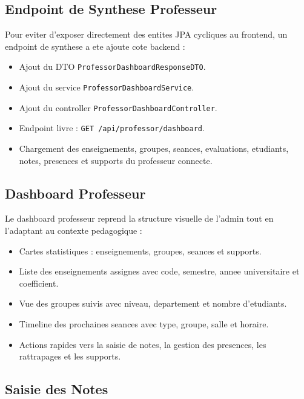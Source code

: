 \documentclass[12pt,a4paper]{report}
\begin{document}
\subsection{Endpoint de Synthese Professeur}

Pour eviter d'exposer directement des entites JPA cycliques au frontend, un endpoint de synthese a ete ajoute cote backend :

\begin{itemize}[itemsep=0.3em]
    \item Ajout du DTO \texttt{ProfessorDashboardResponseDTO}.
    \item Ajout du service \texttt{ProfessorDashboardService}.
    \item Ajout du controller \texttt{ProfessorDashboardController}.
    \item Endpoint livre : \texttt{GET /api/professor/dashboard}.
    \item Chargement des enseignements, groupes, seances, evaluations, etudiants, notes, presences et supports du professeur connecte.
\end{itemize}

\subsection{Dashboard Professeur}

Le dashboard professeur reprend la structure visuelle de l'admin tout en l'adaptant au contexte pedagogique :

\begin{itemize}[itemsep=0.3em]
    \item Cartes statistiques : enseignements, groupes, seances et supports.
    \item Liste des enseignements assignes avec code, semestre, annee universitaire et coefficient.
    \item Vue des groupes suivis avec niveau, departement et nombre d'etudiants.
    \item Timeline des prochaines seances avec type, groupe, salle et horaire.
    \item Actions rapides vers la saisie de notes, la gestion des presences, les rattrapages et les supports.
\end{itemize}

\subsection{Saisie des Notes}
\end{document}
